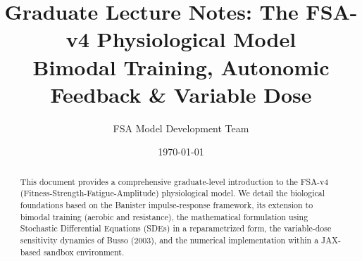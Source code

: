 \documentclass[11pt,a4paper]{article}
\title{Graduate Lecture Notes: The FSA-v4 Physiological Model\\
\large Bimodal Training, Autonomic Feedback \& Variable Dose}
\author{FSA Model Development Team}
\date{\today}
\begin{document}
\maketitle

\begin{abstract}
\noindent
This document provides a comprehensive graduate-level introduction to the FSA-v4 (Fitness-Strength-Fatigue-Amplitude) physiological model. We detail the biological foundations based on the Banister impulse-response framework, its extension to bimodal training (aerobic and resistance), the mathematical formulation using Stochastic Differential Equations (SDEs) in a reparametrized form, the variable-dose sensitivity dynamics of Busso (2003), and the numerical implementation within a JAX-based sandbox environment.
\end{abstract}

\tableofcontents
\newpage




















\end{document}
